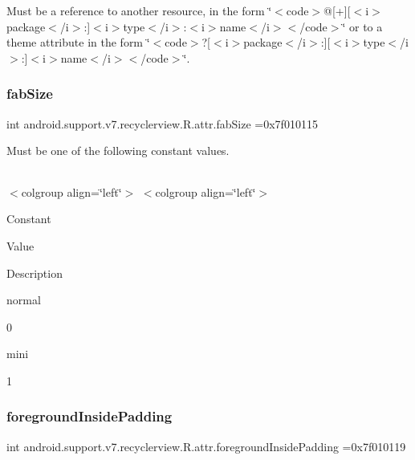 Must be a reference to another resource, in the form \char`\"{}$<$code$>$@\mbox{[}+\mbox{]}\mbox{[}$<$i$>$package$<$/i$>$\+:\mbox{]}$<$i$>$type$<$/i$>$\+:$<$i$>$name$<$/i$>$$<$/code$>$\char`\"{} or to a theme attribute in the form \char`\"{}$<$code$>$?\mbox{[}$<$i$>$package$<$/i$>$\+:\mbox{]}\mbox{[}$<$i$>$type$<$/i$>$\+:\mbox{]}$<$i$>$name$<$/i$>$$<$/code$>$\char`\"{}. \mbox{\label{classandroid_1_1support_1_1v7_1_1recyclerview_1_1R_1_1attr_a33c70e24def5cbe65b52bc7949a08f86}} 
\subsubsection{\texorpdfstring{fab\+Size}{fabSize}}
{\footnotesize\ttfamily int android.\+support.\+v7.\+recyclerview.\+R.\+attr.\+fab\+Size =0x7f010115\hspace{0.3cm}{\ttfamily [static]}}

Must be one of the following constant values.

\tabulinesep=1mm
\begin{longtabu} spread 0pt [c]{*{0}{|X[-1]}|}
\hline
\end{longtabu}
$<$colgroup align=\char`\"{}left\char`\"{}$>$ $<$colgroup align=\char`\"{}left\char`\"{}$>$ 

Constant

Value

Description 

{\ttfamily normal}

0

{\ttfamily mini}

1\mbox{\label{classandroid_1_1support_1_1v7_1_1recyclerview_1_1R_1_1attr_ad4dd313a7af82c441eb54b7bd1ee8e04}} 
\subsubsection{\texorpdfstring{foreground\+Inside\+Padding}{foregroundInsidePadding}}
{\footnotesize\ttfamily int android.\+support.\+v7.\+recyclerview.\+R.\+attr.\+foreground\+Inside\+Padding =0x7f010119\hspace{0.3cm}{\ttfamily [static]}}

